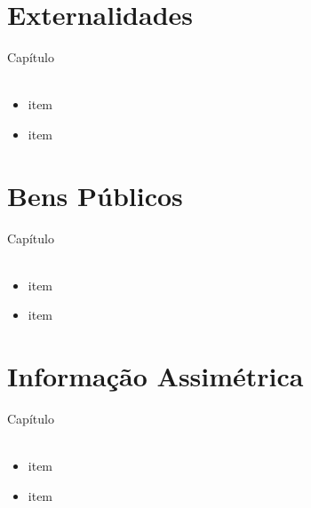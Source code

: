 \documentclass{beamer}[10]
\begin{document}
\begin{frame}
	\frametitle{}

	

\end{frame}

\section[Externalidades]{Externalidades}
\begin{frame}
	\huge Capítulo \normalsize
	\\~\\
	\begin{itemize}
		\item item
		\item item
	\end{itemize}
\end{frame}


\begin{frame}
	\frametitle{}

	

\end{frame}

\section[B.Públicos]{Bens Públicos}
\begin{frame}
	\huge Capítulo \normalsize
	\\~\\
	\begin{itemize}
		\item item
		\item item
	\end{itemize}
\end{frame}


\begin{frame}
	\frametitle{}

	

\end{frame}

\section[I.Assimétrica]{Informação Assimétrica}
\begin{frame}
	\huge Capítulo \normalsize
	\\~\\
	\begin{itemize}
		\item item
		\item item
	\end{itemize}
\end{frame}


\begin{frame}
	\frametitle{}

	

\end{frame}
\end{document}
